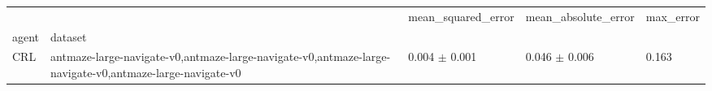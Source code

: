 \begin{tabular}{lllll}
\toprule
 &  & mean_squared_error & mean_absolute_error & max_error \\
agent & dataset &  &  &  \\
\midrule
CRL & antmaze-large-navigate-v0,antmaze-large-navigate-v0,antmaze-large-navigate-v0,antmaze-large-navigate-v0 & 0.004 $\pm$ 0.001 & 0.046 $\pm$ 0.006 & 0.163 \\
\cline{1-5}
\bottomrule
\end{tabular}
